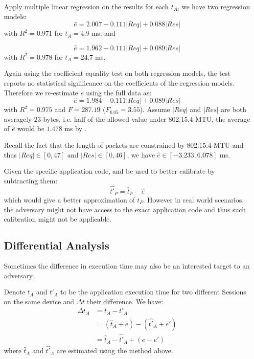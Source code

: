 Apply multiple linear regression on the results for each $t_A$, we have two regression models:
\begin{equation}
	\hat{e} = 2.007 - 0.111|Req| + 0.088|Res|
\end{equation}
with $R^2 = 0.971$ for $t_A = 4.9$ ms, and

\begin{equation}
	\hat{e} = 1.962 - 0.111|Req| + 0.089|Res|
\end{equation}
with $R^2 = 0.978$ for $t_A = 24.7$ ms.

Again using the coefficient equality test on both regression models, the test reports no statistical significance on the coefficients of the regression models. Therefore we re-estimate $e$ using the full data as:
\begin{equation} \label{hate}
	\hat{e} = 1.984 - 0.111|Req| + 0.089|Res|
\end{equation}
with $R^2 = 0.975$ and $F=287.19$ ($F_{0.05} = 3.55$). Assume $|Req|$ and $|Res|$ are both averagely $23$ bytes, i.e. half of the allowed value under 802.15.4 MTU, the average of $\hat{e}$ would be $1.478$ ms by .

Recall the fact that the length of packets are constrained by 802.15.4 MTU and thus $|Req| \in [0,47]$ and $|Res| \in [0,46]$, we have $\hat{e} \in [-3.233,6.078]$ ms.

Given the specific application code,  and be used to better calibrate  by subtracting them:
\begin{equation}
	\hat{t'}_P = \hat{t}_P - \hat{e}
\end{equation}
which would give a better approximation of $t_P$. However in real world scenarios, the adversary might not have access to the exact application code and thus such calibration might not be applicable.

\subsection{Differential Analysis}

Sometimes the difference in execution time may also be an interested target to an adversary. 

Denote $t_A$ and $t'_A$ to be the application execution time for two different Sessions on the same device and $\Delta t$ their difference. We have:
\begin{equation}\label{Eq: delta t}
	\begin{aligned}
		\Delta t_A &= t_A - t'_A \\
			&= (\hat{t}_A + e) - (\hat{t'}_A + e') \\
			&= \hat{t}_A - \hat{t'}_A + (e - e')
	\end{aligned}
\end{equation}
 where $\hat{t}_A$ and $\hat{t'}_A$ are estimated using the method above.

